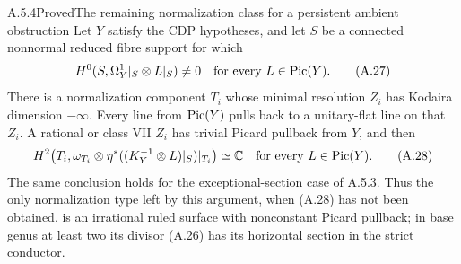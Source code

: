 \begin{statement}{A.5.4}{Proved}{The remaining normalization class for a persistent ambient obstruction}
Let $Y$ satisfy the CDP hypotheses, and let $S$ be a connected nonnormal reduced fibre support for which
\[
 H^0(S,\Omega_Y^1|_S\otimes L|_S)\ne0
 \quad\hbox{for every }L\in\operatorname{Pic}(Y).
 \tag{A.27}
\]
There is a normalization component $T_i$ whose minimal resolution $Z_i$ has Kodaira dimension $-\infty$. Every line from $\operatorname{Pic}(Y)$ pulls back to a unitary-flat line on that $Z_i$. A rational or class VII $Z_i$ has trivial Picard pullback from $Y$, and then
\[
 H^2\!\left(T_i,\omega_{T_i}\otimes
             \eta^*((K_Y^{-1}\otimes L)|_S)|_{T_i}\right)\simeq\mathbb C
 \quad\hbox{for every }L\in\operatorname{Pic}(Y).
 \tag{A.28}
\]
The same conclusion holds for the exceptional-section case of A.5.3. Thus the only normalization type left by this argument, when (A.28) has not been obtained, is an irrational ruled surface with nonconstant Picard pullback; in base genus at least two its divisor (A.26) has its horizontal section in the strict conductor.
\end{statement}

